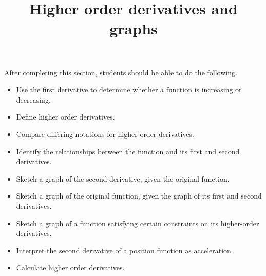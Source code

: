 \documentclass{ximera}
\title{Higher order derivatives and graphs}
\begin{document}
\begin{abstract}
\end{abstract}

\maketitle

\begin{sectionOutcomes}

After completing this section, students should be able to do the following.


\begin{itemize}
\item Use the first derivative to determine whether a function is increasing or decreasing.
\item Define higher order derivatives.
\item Compare differing notations for higher order derivatives.
\item Identify the relationships between the function and its first and second derivatives.
\item Sketch a graph of the second derivative, given the original function.
\item Sketch a graph of the original function, given the graph of its first and second derivatives.
\item Sketch a graph of a function satisfying certain constraints on its higher-order derivatives.
\item Interpret the second derivative of a position function as acceleration. 
\item Calculate higher order derivatives.

\end{itemize}
\end{sectionOutcomes}
\end{document}
